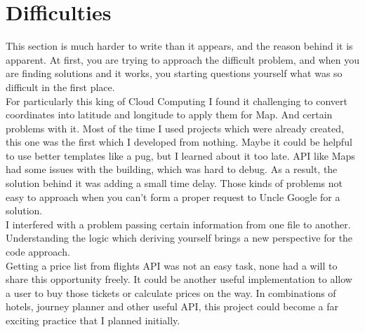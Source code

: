 \documentclass[12pt]{article}
\numberwithin{equation}{section} %
\numberwithin{figure}{section} %
\numberwithin{table}{section} %
\begin{document}
\section{Difficulties}
	
	This section is much harder to write than it appears, and the reason behind it is apparent. At first, you are trying to approach the difficult problem, and when you are finding solutions and it works, you starting questions yourself what was so difficult in the first place. \\
	
	For particularly this king of Cloud Computing I found it challenging to convert coordinates into latitude and longitude to apply them for Map. And certain problems with it.  Most of the time I used projects which were already created, this one was the first which I developed from nothing. Maybe it could be helpful to use better templates like a pug, but I learned about it too late. API like Maps had some issues with the building, which was hard to debug. As a result, the solution behind it was adding a small time delay. Those kinds of problems not easy to approach when you can't form a proper request to Uncle Google for a solution. \\
	I interfered with a problem passing certain information from one file to another. Understanding the logic which deriving yourself brings a new perspective for the code approach. \\
	
	Getting a price list from flights API was not an easy task, none had a will to share this opportunity freely. It could be another useful implementation to allow a user to buy those tickets or calculate prices on the way. In combinations of hotels, journey planner and other useful API, this project could become a far exciting practice that I planned initially.
	
\end{document}
